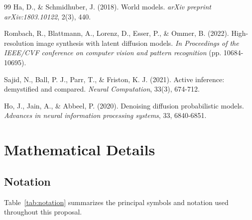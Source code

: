 \documentclass[12pt, a4paper]{article}
\begin{document}
\begin{thebibliography}{99}
Ha, D., \& Schmidhuber, J. (2018). \newblock World models. \newblock \textit{arXiv preprint arXiv:1803.10122}, 2(3), 440.


Rombach, R., Blattmann, A., Lorenz, D., Esser, P., \& Ommer, B. (2022). \newblock High-resolution image synthesis with latent diffusion models. \newblock \textit{In Proceedings of the IEEE/CVF conference on computer vision and pattern recognition} (pp. 10684-10695).

Sajid, N., Ball, P. J., Parr, T., \& Friston, K. J. (2021). \newblock Active inference: demystified and compared. \newblock \textit{Neural Computation}, 33(3), 674-712.


Ho, J., Jain, A., \& Abbeel, P. (2020). \newblock Denoising diffusion probabilistic models. \newblock \textit{Advances in neural information processing systems}, 33, 6840-6851.

\end{thebibliography}


\newpage
\appendix

\section{Mathematical Details}
\label{app:equations}

\subsection{Notation}

Table~\ref{tab:notation} summarizes the principal symbols and notation used throughout this proposal.
\end{document}

